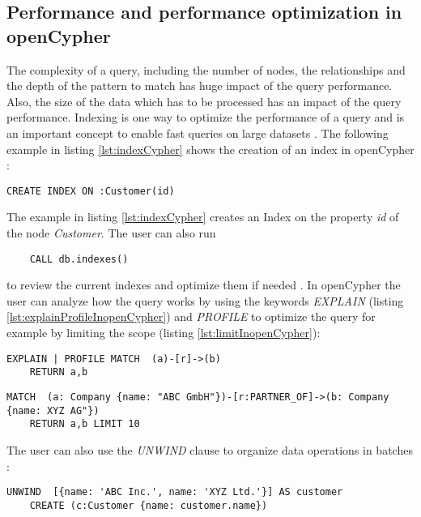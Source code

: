 \subsection{Performance and performance optimization in openCypher}
\label{subsec:different_query_languages_for_graph_databases:openCypher:performance}
The complexity of a query, including the number of nodes, the relationships and the depth of the
pattern to match has huge impact of the query performance. Also, the size of the data which has 
to be processed has an impact of the query performance. Indexing is one way to optimize the 
performance of a query and is an important concept to enable fast queries on large 
datasets \citep{7231397}. 
The following example in listing \ref{lst:indexCypher} shows the creation of an index in openCypher \citep{noauthor_opencypher_2024}:
\begin{lstlisting}[caption={Index creation in openCypher}, label={lst:indexCypher}] 
	CREATE INDEX ON :Customer(id)
\end{lstlisting}
The example in listing \ref{lst:indexCypher} creates an Index on the property \textit{id}
of the node \textit{Customer}. The user can also run 
\begin{lstlisting} 
	CALL db.indexes()
\end{lstlisting}
to review the current indexes and optimize them if needed \citep{noauthor_opencypher_2024}.
\newline
In openCypher the user can analyze how the query works by using the keywords \textit{EXPLAIN} (listing \ref{lst:explainProfileInopenCypher})
and \textit{PROFILE} to optimize the query for example by limiting the scope (listing \ref{lst:limitInopenCypher}):
\begin{lstlisting}[caption={Using EXPLAIN or PROFILE in openCypher}, label={lst:explainProfileInopenCypher}] 
	EXPLAIN | PROFILE MATCH  (a)-[r]->(b)
	RETURN a,b
\end{lstlisting}
\begin{lstlisting}[caption={Set a Limit in openCypher}, label={lst:limitInopenCypher}] 
	MATCH  (a: Company {name: "ABC GmbH"})-[r:PARTNER_OF]->(b: Company {name: XYZ AG"})
	RETURN a,b LIMIT 10
\end{lstlisting}
The user can also use the \textit{UNWIND} clause to organize data operations in batches  \citep{noauthor_opencypher_2024}:
\begin{lstlisting}[caption={Batch operations in openCypher using UNWIND}, label={lst:batchInopenCypher}] 
	UNWIND  [{name: 'ABC Inc.', name: 'XYZ Ltd.'}] AS customer
	CREATE (c:Customer {name: customer.name})
\end{lstlisting}

